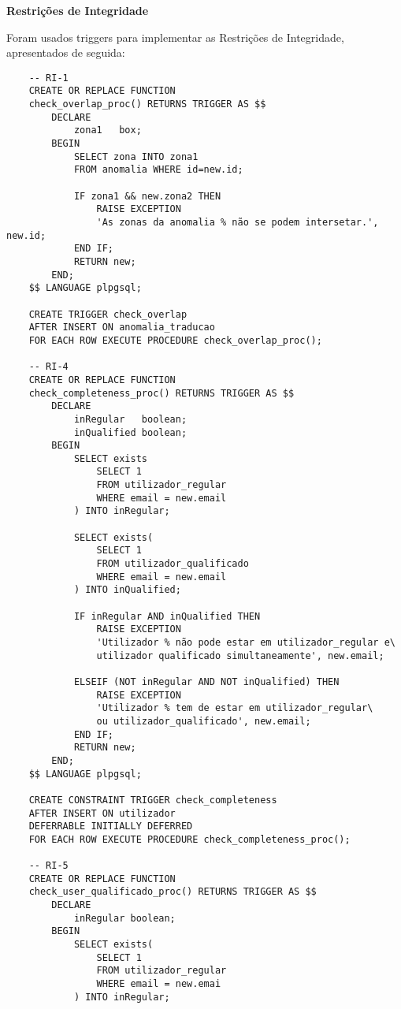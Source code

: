 \documentclass[12pt]{report}
\begin{document}
    \Large
    \textbf{Restrições de Integridade}\\
    \normalsize
    \par Foram usados triggers para implementar as Restrições de Integridade, apresentados de seguida:
    \footnotesize
    \begin{verbatim}
    -- RI-1
    CREATE OR REPLACE FUNCTION
    check_overlap_proc() RETURNS TRIGGER AS $$
        DECLARE
            zona1   box;
        BEGIN
            SELECT zona INTO zona1
            FROM anomalia WHERE id=new.id;

            IF zona1 && new.zona2 THEN
                RAISE EXCEPTION
                'As zonas da anomalia % não se podem intersetar.', new.id;
            END IF;
            RETURN new;
        END;
    $$ LANGUAGE plpgsql;

    CREATE TRIGGER check_overlap
    AFTER INSERT ON anomalia_traducao
    FOR EACH ROW EXECUTE PROCEDURE check_overlap_proc();

    -- RI-4
    CREATE OR REPLACE FUNCTION
    check_completeness_proc() RETURNS TRIGGER AS $$
        DECLARE
            inRegular   boolean;
            inQualified boolean;
        BEGIN
            SELECT exists
                SELECT 1
                FROM utilizador_regular
                WHERE email = new.email
            ) INTO inRegular;

            SELECT exists(
                SELECT 1
                FROM utilizador_qualificado
                WHERE email = new.email
            ) INTO inQualified;

            IF inRegular AND inQualified THEN
                RAISE EXCEPTION
                'Utilizador % não pode estar em utilizador_regular e\
                utilizador qualificado simultaneamente', new.email;

            ELSEIF (NOT inRegular AND NOT inQualified) THEN
                RAISE EXCEPTION
                'Utilizador % tem de estar em utilizador_regular\
                ou utilizador_qualificado', new.email;
            END IF;
            RETURN new;
        END;
    $$ LANGUAGE plpgsql;

    CREATE CONSTRAINT TRIGGER check_completeness
    AFTER INSERT ON utilizador
    DEFERRABLE INITIALLY DEFERRED
    FOR EACH ROW EXECUTE PROCEDURE check_completeness_proc();

    -- RI-5
    CREATE OR REPLACE FUNCTION
    check_user_qualificado_proc() RETURNS TRIGGER AS $$
        DECLARE
            inRegular boolean;
        BEGIN
            SELECT exists(
                SELECT 1
                FROM utilizador_regular
                WHERE email = new.emai
            ) INTO inRegular;


\end{verbatim}
\end{document}
